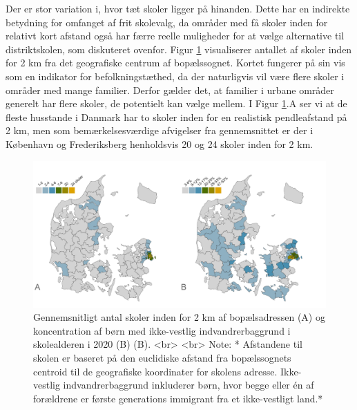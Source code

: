 \documentclass[
]{book}
\begin{document}
Der er stor variation i, hvor tæt skoler ligger på hinanden. Dette har en indirekte betydning for omfanget af frit skolevalg, da områder med få skoler inden for relativt kort afstand også har færre reelle muligheder for at vælge alternative til distriktskolen, som diskuteret ovenfor. Figur \ref{fig:fig-4-1} visualiserer antallet af skoler inden for 2 km fra det geografiske centrum af bopælssognet. Kortet fungerer på sin vis som en indikator for befolkningstæthed, da der naturligvis vil være flere skoler i områder med mange familier. Derfor gælder det, at familier i urbane områder generelt har flere skoler, de potentielt kan vælge mellem. I Figur \ref{fig:fig-4-1}.A ser vi at de fleste husstande i Danmark har to skoler inden for en realistisk pendleafstand på 2 km, men som bemærkelsesværdige afvigelser fra gennemsnittet er der i København og Frederiksberg henholdsvis 20 og 24 skoler inden for 2 km.

\begin{figure}
\includegraphics[width=1\linewidth]{images/figur_3_1c_distance_antal} \caption{Gennemsnitligt antal skoler inden for 2 km af bopælsadressen (A) og koncentration af børn med ikke-vestlig indvandrerbaggrund i skolealderen i 2020 (B) (B). <br> <br> Note: * Afstandene til skolen er baseret på den euclidiske afstand fra bopælssognets centroid til de geografiske koordinater for skolens adresse. Ikke-vestlig indvandrerbaggrund inkluderer børn, hvor begge eller én af forældrene er første generations immigrant fra et ikke-vestligt land.*}\label{fig:fig-4-1}
\end{figure}
\end{document}
